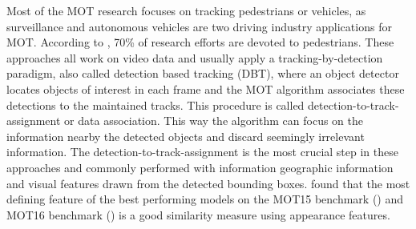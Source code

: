 \documentclass[12pt,a4paper]{article}
\begin{document}
Most of the MOT research focuses on tracking pedestrians or vehicles, as surveillance and autonomous vehicles are two driving industry applications for MOT. According to \cite{mot_lit_rev}, 70\% of research efforts are devoted to pedestrians. These approaches all work on video data and usually apply a tracking-by-detection paradigm, also called detection based tracking (DBT), where an object detector locates objects of interest in each frame and the MOT algorithm associates these detections to the maintained tracks. This procedure is called detection-to-track-assignment or data association. This way the algorithm can focus on the information nearby the detected objects and discard seemingly irrelevant information. The detection-to-track-assignment is the most crucial step in these approaches and commonly performed with information geographic information and visual features drawn from the detected bounding boxes. \cite{tracking_the_trackers} found  that the most defining feature of the best performing models on the MOT15 benchmark (\cite{MOT15}) and MOT16 benchmark (\cite{MOT16}) is a good similarity measure using appearance features.
\end{document}
